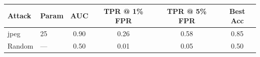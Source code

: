 \begin{tabular}{llcccc}
\toprule
Attack & Param & AUC & TPR @ 1\% FPR & TPR @ 5\% FPR & Best Acc \\
\midrule
jpeg & 25 & 0.90 & 0.26 & 0.58 & 0.85 \\
Random & — & 0.50 & 0.01 & 0.05 & 0.50 \\
\bottomrule
\end{tabular}
